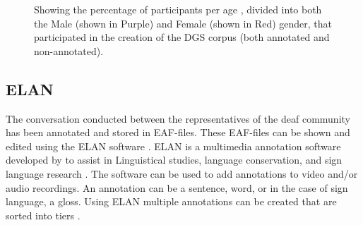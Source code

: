 \mydata

\begin{figure}[h]
\caption{Showing the percentage of participants per age , divided into both the Male (shown in Purple) and Female (shown in Red) gender,  that participated in the creation of the DGS corpus (both annotated and non-annotated). \cite{age_data_hamburg}}

\label{fig:bundeslander}
\end{figure}

\subsection{ELAN}
The conversation conducted between the representatives of the deaf community has been annotated and stored in EAF-files. These EAF-files can be shown and edited using the ELAN software \cite{crasborn2008enhanced}. ELAN is a multimedia annotation software developed by \citep{elan_software} to assist in Linguistical studies, language conservation, and sign language research \cite{brugman2004annotating}. The software can be used to add annotations to video and/or audio recordings. An annotation can be a sentence, word, or in the case of sign language, a gloss. Using ELAN multiple annotations can be created that are sorted into tiers \cite{crasborn2008enhanced}.  

